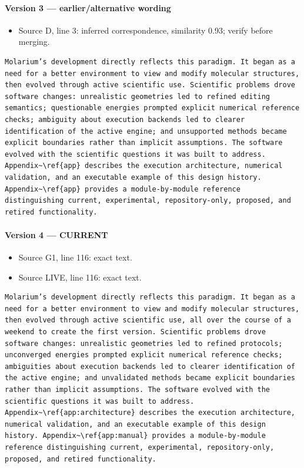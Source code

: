 \documentclass[11pt]{article}
\begin{document}
\paragraph{Version 3 --- earlier/alternative wording}

\begin{itemize}[leftmargin=*]
\item Source D, line 3: inferred correspondence, similarity 0.93; verify before merging.
\end{itemize}

\begin{lstlisting}
Molarium’s development directly reflects this paradigm. It began as a need for a better environment to view and modify molecular structures, then evolved through active scientific use. Scientific problems drove software changes: unrealistic geometries led to refined editing semantics; questionable energies prompted explicit numerical reference checks; ambiguity about execution backends led to clearer identification of the active engine; and unsupported methods became explicit boundaries rather than implicit assumptions. The software evolved with the scientific questions it was built to address. Appendix~\ref{app} describes the execution architecture, numerical validation, and an executable example of this design history. Appendix~\ref{app} provides a module-by-module reference distinguishing current, experimental, repository-only, proposed, and retired functionality.
\end{lstlisting}

\paragraph{Version 4 --- CURRENT}

\begin{itemize}[leftmargin=*]
\item Source G1, line 116: exact text.
\item Source LIVE, line 116: exact text.
\end{itemize}

\begin{lstlisting}
Molarium’s development directly reflects this paradigm. It began as a need for a better environment to view and modify molecular structures, then evolved through active scientific use, all over the course of a weekend to create the first version. Scientific problems drove software changes: unrealistic geometries led to refined protocols; unconverged energies prompted explicit numerical reference checks; ambiguities about execution backends led to clearer identification of the active engine; and unvalidated methods became explicit boundaries rather than implicit assumptions. The software evolved with the scientific questions it was built to address. Appendix~\ref{app:architecture} describes the execution architecture, numerical validation, and an executable example of this design history. Appendix~\ref{app:manual} provides a module-by-module reference distinguishing current, experimental, repository-only, proposed, and retired functionality.
\end{lstlisting}
\end{document}
